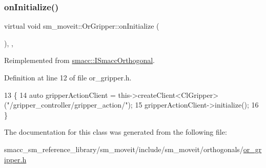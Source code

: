 \subsubsection{\texorpdfstring{on\+Initialize()}{onInitialize()}}
{\footnotesize\ttfamily virtual void sm\+\_\+moveit\+::\+Or\+Gripper\+::on\+Initialize (\begin{DoxyParamCaption}{ }\end{DoxyParamCaption})\hspace{0.3cm}{\ttfamily [inline]}, {\ttfamily [override]}, {\ttfamily [virtual]}}



Reimplemented from \hyperlink{classsmacc_1_1ISmaccOrthogonal_a6bb31c620cb64dd7b8417f8705c79c7a}{smacc\+::\+I\+Smacc\+Orthogonal}.



Definition at line 12 of file or\+\_\+gripper.\+h.


\begin{DoxyCode}
13     \{
14         \textcolor{keyword}{auto} gripperActionClient = this->createClient<ClGripper>(\textcolor{stringliteral}{"/gripper\_controller/gripper\_action/"});
15         gripperActionClient->initialize();
16     \}
\end{DoxyCode}


The documentation for this class was generated from the following file\+:\begin{DoxyCompactItemize}
\item 
smacc\+\_\+sm\+\_\+reference\+\_\+library/sm\+\_\+moveit/include/sm\+\_\+moveit/orthogonals/\hyperlink{or__gripper_8h}{or\+\_\+gripper.\+h}\end{DoxyCompactItemize}

